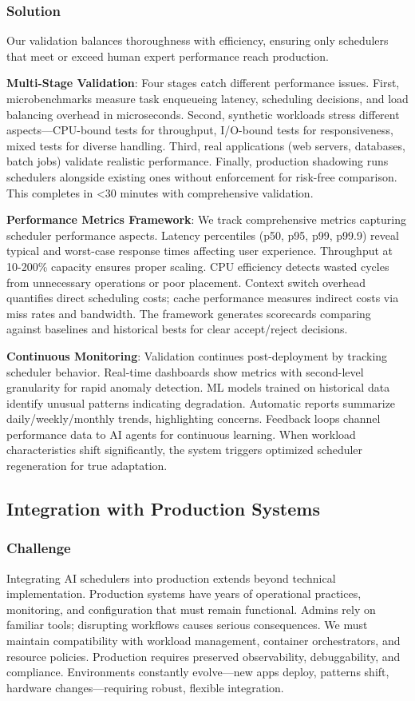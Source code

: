 \subsubsection{Solution}
Our validation balances thoroughness with efficiency, ensuring only schedulers that meet or exceed human expert performance reach production.

\textbf{Multi-Stage Validation}: Four stages catch different performance issues. First, microbenchmarks measure task enqueueing latency, scheduling decisions, and load balancing overhead in microseconds. Second, synthetic workloads stress different aspects—CPU-bound tests for throughput, I/O-bound tests for responsiveness, mixed tests for diverse handling. Third, real applications (web servers, databases, batch jobs) validate realistic performance. Finally, production shadowing runs schedulers alongside existing ones without enforcement for risk-free comparison. This completes in <30 minutes with comprehensive validation.

\textbf{Performance Metrics Framework}: We track comprehensive metrics capturing scheduler performance aspects. Latency percentiles (p50, p95, p99, p99.9) reveal typical and worst-case response times affecting user experience. Throughput at 10-200\% capacity ensures proper scaling. CPU efficiency detects wasted cycles from unnecessary operations or poor placement. Context switch overhead quantifies direct scheduling costs; cache performance measures indirect costs via miss rates and bandwidth. The framework generates scorecards comparing against baselines and historical bests for clear accept/reject decisions.

\textbf{Continuous Monitoring}: Validation continues post-deployment by tracking scheduler behavior. Real-time dashboards show metrics with second-level granularity for rapid anomaly detection. ML models trained on historical data identify unusual patterns indicating degradation. Automatic reports summarize daily/weekly/monthly trends, highlighting concerns. Feedback loops channel performance data to AI agents for continuous learning. When workload characteristics shift significantly, the system triggers optimized scheduler regeneration for true adaptation.

\subsection{Integration with Production Systems}

\subsubsection{Challenge}
Integrating AI schedulers into production extends beyond technical implementation. Production systems have years of operational practices, monitoring, and configuration that must remain functional. Admins rely on familiar tools; disrupting workflows causes serious consequences. We must maintain compatibility with workload management, container orchestrators, and resource policies. Production requires preserved observability, debuggability, and compliance. Environments constantly evolve—new apps deploy, patterns shift, hardware changes—requiring robust, flexible integration.

